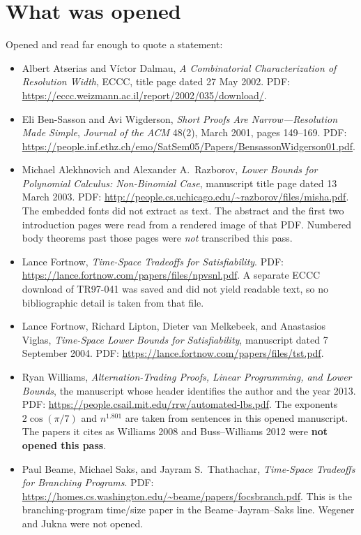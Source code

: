 \documentclass[11pt]{article}
\begin{document}
\section*{What was opened}
Opened and read far enough to quote a statement:
\begin{itemize}
\item Albert Atserias and V\'ictor Dalmau, \emph{A Combinatorial Characterization of Resolution Width}, ECCC, title page dated 27 May 2002. PDF:
\url{https://eccc.weizmann.ac.il/report/2002/035/download/}.
\item Eli Ben-Sasson and Avi Wigderson, \emph{Short Proofs Are Narrow---Resolution Made Simple}, \emph{Journal of the ACM} 48(2), March 2001, pages 149--169. PDF:
\url{https://people.inf.ethz.ch/emo/SatSem05/Papers/BensassonWidgerson01.pdf}.
\item Michael Alekhnovich and Alexander A.\ Razborov, \emph{Lower Bounds for Polynomial Calculus: Non-Binomial Case}, manuscript title page dated 13 March 2003. PDF:
\url{http://people.cs.uchicago.edu/~razborov/files/misha.pdf}.
The embedded fonts did not extract as text. The abstract and the first two introduction pages were read from a rendered image of that PDF. Numbered body theorems past those pages were \emph{not} transcribed this pass.
\item Lance Fortnow, \emph{Time-Space Tradeoffs for Satisfiability}. PDF:
\url{https://lance.fortnow.com/papers/files/npvsnl.pdf}.
A separate ECCC download of TR97-041 was saved and did not yield readable text, so no bibliographic detail is taken from that file.
\item Lance Fortnow, Richard Lipton, Dieter van Melkebeek, and Anastasios Viglas, \emph{Time-Space Lower Bounds for Satisfiability}, manuscript dated 7 September 2004. PDF:
\url{https://lance.fortnow.com/papers/files/tst.pdf}.
\item Ryan Williams, \emph{Alternation-Trading Proofs, Linear Programming, and Lower Bounds}, the manuscript whose header identifies the author and the year 2013. PDF:
\url{https://people.csail.mit.edu/rrw/automated-lbs.pdf}.
The exponents \(2\cos(\pi/7)\) and \(n^{1.801}\) are taken from sentences in this opened manuscript. The papers it cites as Williams 2008 and Buss--Williams 2012 were \textbf{not opened this pass}.
\item Paul Beame, Michael Saks, and Jayram S.\ Thathachar, \emph{Time-Space Tradeoffs for Branching Programs}. PDF:
\url{https://homes.cs.washington.edu/~beame/papers/focsbranch.pdf}.
This is the branching-program time/size paper in the Beame--Jayram--Saks line. Wegener and Jukna were not opened.
\end{itemize}
\end{document}
